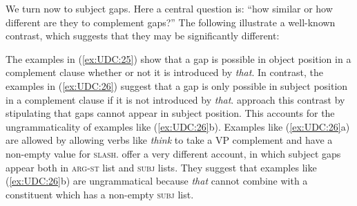 \documentclass[output=paper
,notxmath 
 	        ,biblatex
                ,babelshorthands
                ,newtxmath
                ,draftmode
                ,colorlinks, citecolor=brown
]{langscibook}
\begin{document}


We\label{udc:page-subject-gaps-start} turn now to subject gaps. Here a central question is: ``how similar or
how different are they to complement gaps?'' The following illustrate a
well-known contrast, which suggests that they may be significantly
different:

\begin{exe} \ex \begin{xlist} \label{ex:UDC:25}

\end{xlist}
\end{exe}

\begin{exe} \ex \begin{xlist} \label{ex:UDC:26}

\end{xlist}
\end{exe}

\noindent
The examples in (\ref{ex:UDC:25}) show that a gap is possible in
object position in a complement clause whether or not it is introduced
by \emph{that}. In contrast, the examples in (\ref{ex:UDC:26}) suggest
that a gap is only possible in subject position in a complement clause
if it is not introduced by
\emph{that}. \citet[Chapter~4.4]{Pollard:Sag:94} approach this
contrast by stipulating that gaps cannot appear in subject
position. This accounts for the ungrammaticality of examples like
(\ref{ex:UDC:26}b). Examples like (\ref{ex:UDC:26}a) are allowed by
allowing verbs like \textit{think} to take a VP complement and have a
non-empty value for
\textsc{slash}. \citet[Chapter~5.1.3]{Ginzburg:Sag:01} offer a very
different account, in which subject gaps appear both in
\textsc{arg-st} list and \textsc{subj} lists. They suggest that
examples like (\ref{ex:UDC:26}b) are ungrammatical because \emph{that}
cannot combine with a constituent which has a non-empty \textsc{subj}
list.
\end{document}
